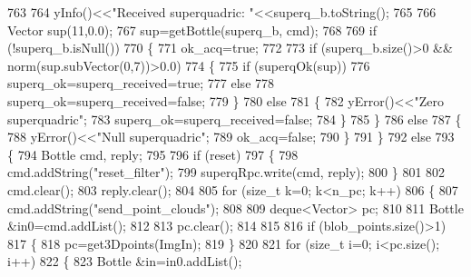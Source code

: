 \begin{DoxyCode}
763 
764                 yInfo()<<\textcolor{stringliteral}{"Received superquadric: "}<<superq\_b.toString();
765 
766                 Vector sup(11,0.0);
767                 sup=getBottle(superq\_b, cmd);
768                 
769                 \textcolor{keywordflow}{if} (!superq\_b.isNull())
770                 \{
771                     ok\_acq=\textcolor{keyword}{true};
772                     
773                     \textcolor{keywordflow}{if} (superq\_b.size()>0 && norm(sup.subVector(0,7))>0.0)
774                    \{
775                         \textcolor{keywordflow}{if} (superqOk(sup))
776                             superq\_ok=superq\_received=\textcolor{keyword}{true};
777                         \textcolor{keywordflow}{else}
778                             superq\_ok=superq\_received=\textcolor{keyword}{false};
779                     \}
780                     \textcolor{keywordflow}{else}
781                     \{
782                         yError()<<\textcolor{stringliteral}{"Zero superquadric"};
783                         superq\_ok=superq\_received=\textcolor{keyword}{false};                       
784                     \}
785                 \}
786                 \textcolor{keywordflow}{else}
787                 \{
788                     yError()<<\textcolor{stringliteral}{"Null superquadric"};  
789                     ok\_acq=\textcolor{keyword}{false};
790                 \}
791             \}
792             \textcolor{keywordflow}{else}
793             \{
794                 Bottle cmd, reply;
795 
796                 \textcolor{keywordflow}{if} (reset)
797                 \{
798                     cmd.addString(\textcolor{stringliteral}{"reset\_filter"});
799                     superqRpc.write(cmd, reply);
800                 \}
801 
802                 cmd.clear();
803                 reply.clear();
804 
805                 \textcolor{keywordflow}{for} (\textcolor{keywordtype}{size\_t} k=0; k<n\_pc; k++)
806                 \{
807                     cmd.addString(\textcolor{stringliteral}{"send\_point\_clouds"});
808 
809                     deque<Vector> pc;
810 
811                     Bottle &in0=cmd.addList();
812 
813                     pc.clear();
814                   
815 
816                     \textcolor{keywordflow}{if} (blob\_points.size()>1)
817                     \{
818                         pc=get3Dpoints(ImgIn);
819                     \}
820 
821                     \textcolor{keywordflow}{for} (\textcolor{keywordtype}{size\_t} i=0; i<pc.size(); i++)
822                     \{
823                         Bottle &in=in0.addList();

\end{DoxyCode}
